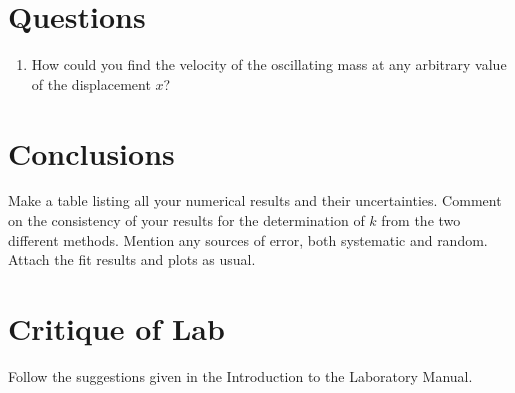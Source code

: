 \section*{Questions}
\begin{enumerate}
\item How could you find the velocity of the oscillating mass 
         at any arbitrary value of the displacement $x$?
\end{enumerate}

\section*{Conclusions}
Make a table listing all your numerical results and their uncertainties.
Comment on the consistency of your results for the determination of $k$ from
the two different methods.  Mention any sources of error, both
systematic and random.  Attach the fit results and plots as usual.

\section*{Critique of Lab}
     Follow the suggestions given in the Introduction to the
Laboratory Manual.
